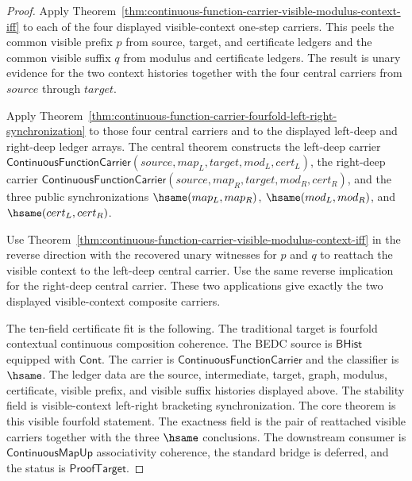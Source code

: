 \begin{proof}
Apply Theorem~\ref{thm:continuous-function-carrier-visible-modulus-context-iff}
to each of the four displayed visible-context one-step carriers. This peels the
common visible prefix $p$ from source, target, and certificate ledgers and the
common visible suffix $q$ from modulus and certificate ledgers. The result is
unary evidence for the two context histories together with the four central
carriers from $source$ through $target$.

Apply
Theorem~\ref{thm:continuous-function-carrier-fourfold-left-right-synchronization}
to those four central carriers and to the displayed left-deep and right-deep
ledger arrays. The central theorem constructs the left-deep carrier
$\mathsf{ContinuousFunctionCarrier}(source,map_L,target,mod_L,cert_L)$, the
right-deep carrier
$\mathsf{ContinuousFunctionCarrier}(source,map_R,target,mod_R,cert_R)$, and the
three public synchronizations
$\hsame(map_L,map_R)$, $\hsame(mod_L,mod_R)$, and $\hsame(cert_L,cert_R)$.

Use Theorem~\ref{thm:continuous-function-carrier-visible-modulus-context-iff}
in the reverse direction with the recovered unary witnesses for $p$ and $q$ to
reattach the visible context to the left-deep central carrier. Use the same
reverse implication for the right-deep central carrier. These two applications
give exactly the two displayed visible-context composite carriers.

The ten-field certificate fit is the following. The traditional target is
fourfold contextual continuous composition coherence. The BEDC source is
$\mathsf{BHist}$ equipped with $\mathsf{Cont}$. The carrier is
$\mathsf{ContinuousFunctionCarrier}$ and the classifier is $\hsame$. The ledger
data are the source, intermediate, target, graph, modulus, certificate, visible
prefix, and visible suffix histories displayed above. The stability field is
visible-context left-right bracketing synchronization. The core theorem is this
visible fourfold statement. The exactness field is the pair of reattached
visible carriers together with the three $\hsame$ conclusions. The downstream
consumer is $\mathsf{ContinuousMapUp}$ associativity coherence, the standard
bridge is deferred, and the status is $\mathsf{ProofTarget}$.
\end{proof}
